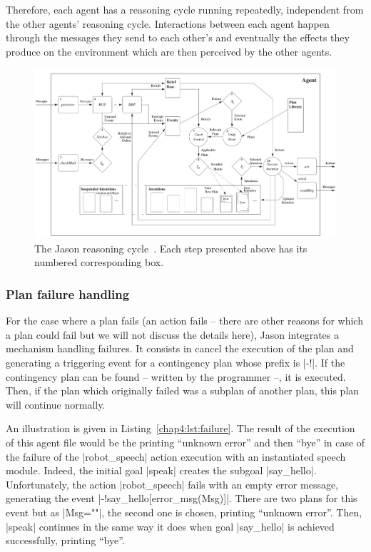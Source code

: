 \documentclass[a4paper,11pt,twoside]{StyleThese}
\begin{document}
Therefore, each agent has a reasoning cycle running repeatedly, independent from the other agents' reasoning cycle. Interactions between each agent happen through the messages they send to each other's and eventually the effects they produce on the environment which are then perceived by the other agents. 


\begin{landscape}
\begin{figure}
	\includegraphics[width=\linewidth]{figures/chapter2/jason_cycle.png}
	\caption{The Jason reasoning cycle~\citep{bordini_2007_jason}. Each step presented above has its numbered corresponding box.}
	\label{chap4:fig:jason_cycle}
\end{figure}
\end{landscape}

\subsubsection{Plan failure handling}

For the case where a plan fails (\eg an action fails -- there are other reasons for which a plan could fail but we will not discuss the details here), Jason integrates a mechanism handling failures. It consists in cancel the execution of the plan and generating a triggering event for a contingency plan whose prefix is |-!|. If the contingency plan can be found -- written by the programmer --, it is executed. Then, if the plan which originally failed was a subplan of another plan, this plan will continue normally. 

An illustration is given in Listing~\ref{chap4:lst:failure}. The result of the execution of this agent file would be the printing ``unknown error'' and then ``bye'' in case of the failure of the |robot_speech| action execution with an instantiated speech module. Indeed, the initial goal |speak| creates the subgoal |say_hello|. Unfortunately, the action |robot_speech| fails with an empty error message, generating the event |-!say_hello[error_msg(Msg)]|. There are two plans for this event but as |Msg=""|, the second one is chosen, printing ``unknown error''. Then, |speak| continues in the same way it does when goal |say_hello| is achieved successfully, printing ``bye''.
\end{document}
